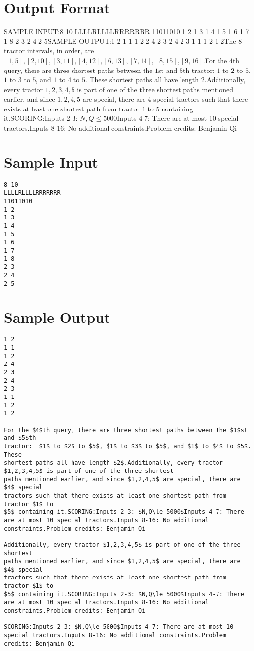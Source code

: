 \documentclass[12pt]{article}
\begin{document}
\section*{Output Format}
SAMPLE INPUT:8 10
LLLLRLLLLRRRRRRR
11011010
1 2
1 3
1 4
1 5
1 6
1 7
1 8
2 3
2 4
2 5SAMPLE OUTPUT:1 2
1 1
1 2
2 4
2 3
2 4
2 3
1 1
1 2
1 2The $8$ tractor intervals, in order, are
$[1, 5], [2, 10], [3, 11], [4, 12], [6, 13], [7, 14], [8, 15], [9, 16]$.For the $4$th query, there are three shortest paths between the $1$st and $5$th
tractor:  $1$ to $2$ to $5$, $1$ to $3$ to $5$, and $1$ to $4$ to $5$. These
shortest paths all have length $2$.Additionally, every tractor $1,2,3,4,5$ is part of one of the three shortest
paths mentioned earlier, and since $1,2,4,5$ are special, there are $4$ special
tractors such that there exists at least one shortest path from tractor $1$ to
$5$ containing it.SCORING:Inputs 2-3: $N,Q\le 5000$Inputs 4-7: There are at most 10 special tractors.Inputs 8-16: No additional constraints.Problem credits: Benjamin Qi

\section*{Sample Input}
\begin{verbatim}
8 10
LLLLRLLLLRRRRRRR
11011010
1 2
1 3
1 4
1 5
1 6
1 7
1 8
2 3
2 4
2 5
\end{verbatim}

\section*{Sample Output}
\begin{verbatim}
1 2
1 1
1 2
2 4
2 3
2 4
2 3
1 1
1 2
1 2

For the $4$th query, there are three shortest paths between the $1$st and $5$th
tractor:  $1$ to $2$ to $5$, $1$ to $3$ to $5$, and $1$ to $4$ to $5$. These
shortest paths all have length $2$.Additionally, every tractor $1,2,3,4,5$ is part of one of the three shortest
paths mentioned earlier, and since $1,2,4,5$ are special, there are $4$ special
tractors such that there exists at least one shortest path from tractor $1$ to
$5$ containing it.SCORING:Inputs 2-3: $N,Q\le 5000$Inputs 4-7: There are at most 10 special tractors.Inputs 8-16: No additional constraints.Problem credits: Benjamin Qi

Additionally, every tractor $1,2,3,4,5$ is part of one of the three shortest
paths mentioned earlier, and since $1,2,4,5$ are special, there are $4$ special
tractors such that there exists at least one shortest path from tractor $1$ to
$5$ containing it.SCORING:Inputs 2-3: $N,Q\le 5000$Inputs 4-7: There are at most 10 special tractors.Inputs 8-16: No additional constraints.Problem credits: Benjamin Qi

SCORING:Inputs 2-3: $N,Q\le 5000$Inputs 4-7: There are at most 10 special tractors.Inputs 8-16: No additional constraints.Problem credits: Benjamin Qi
\end{verbatim}
\end{document}
